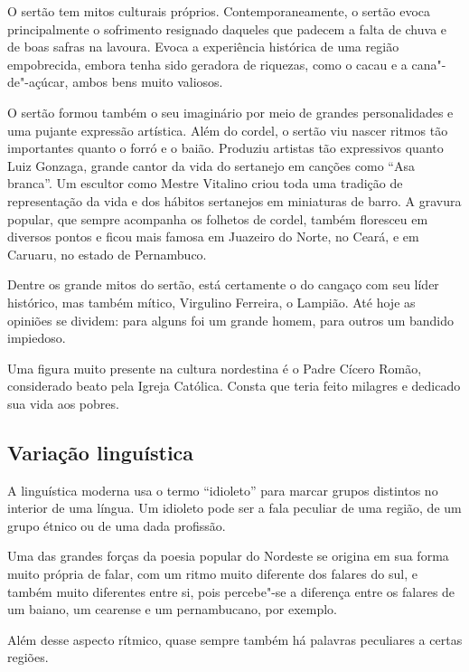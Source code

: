 O sertão tem mitos culturais próprios. Contemporaneamente, o sertão
evoca principalmente o sofrimento resignado daqueles que padecem a
falta de chuva e de boas safras na lavoura. Evoca a experiência
histórica de uma região empobrecida, embora tenha sido geradora de
riquezas, como o cacau e a cana"-de"-açúcar, ambos bens muito valiosos. 

O sertão formou também o seu imaginário por meio de grandes
personalidades e uma pujante expressão artística. Além do cordel, o
sertão viu nascer ritmos tão importantes quanto o forró e o baião.
Produziu artistas tão expressivos quanto Luiz Gonzaga, grande cantor da
vida do sertanejo em canções como ``Asa
branca''. Um escultor como Mestre Vitalino criou toda
uma tradição de representação da vida e dos hábitos sertanejos em
miniaturas de barro. A gravura popular, que sempre acompanha os
folhetos de cordel, também floresceu em diversos pontos e ficou mais
famosa em Juazeiro do Norte, no Ceará, e em Caruaru, no estado de
Pernambuco. 

Dentre os grande mitos do sertão, está certamente o do cangaço com seu
líder histórico, mas também mítico, Virgulino Ferreira, o Lampião. Até
hoje as opiniões se dividem: para alguns foi um grande homem, para
outros um bandido impiedoso. 

Uma figura muito presente na cultura nordestina é o Padre Cícero Romão,
considerado beato pela Igreja Católica. Consta que teria feito milagres
e dedicado sua vida aos pobres. 

\subsection{Variação linguística}

A linguística moderna usa o termo ``idioleto'' para marcar grupos
distintos no interior de uma língua. Um idioleto pode ser a fala
peculiar de uma região, de um grupo étnico ou de uma dada profissão. 

Uma das grandes forças da poesia popular do Nordeste se origina em sua
forma muito própria de falar, com um ritmo muito diferente dos falares
do sul, e também muito diferentes entre si, pois percebe"-se a diferença
entre os falares de um baiano, um cearense e um pernambucano, por
exemplo.

Além desse aspecto rítmico, quase sempre também há palavras peculiares a
certas regiões. 

